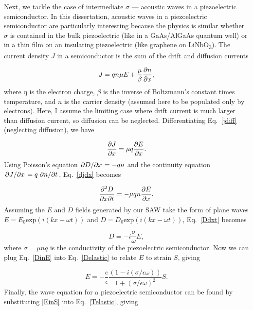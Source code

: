 \documentclass[double,12pt,1in,seploa]{beavtex}
\begin{document}
Next, we tackle the case of intermediate $\sigma$ — acoustic waves in a piezoelectric semiconductor. In this dissertation, acoustic waves in a piezoelectric semiconductor are particularly interesting because the physics is similar whether $\sigma$ is contained in the bulk piezoelectric (like in a GaAs/AlGaAs quantum well) or in a thin film on an insulating piezoelectric (like graphene on LiNbO\textsubscript{3}). The current density $J$ in a semiconductor is the sum of the drift and diffusion currents

\begin{equation}
    J = q n \mu E + \frac{\mu}{\beta} \pdv{n}{x}, \label{jdiff}
\end{equation}
where q is the electron charge, $\beta$ is the inverse of Boltzmann's constant times temperature, and $n$ is the carrier density (assumed here to be populated only by electrons). Here, I assume the limiting case where drift current is much larger than diffusion current, so diffusion can be neglected. Differentiating Eq.\ \ref{jdiff} (neglecting diffusion), we have

\begin{equation}
    \pdv{J}{x} = \mu q \pdv{E}{x}. \label{djdx}
\end{equation}
Using Poisson's equation $\pdv*{D}{x} = -qn$ and the continuity equation $\pdv*{J}{x} = q \pdv*{n}{t}$, Eq.\ \ref{djdx} becomes

\begin{equation}
    \pdv{D}{x}{t} = -\mu q n \pdv{E}{x}. \label{Ddxt}
\end{equation}
Assuming the $E$ and $D$ fields generated by our SAW take the form of plane waves $E = E_0 \mathrm{exp}(i(kx - \omega t))$ and $D = D_0 \mathrm{exp}(i(kx - \omega t))$, Eq.\ \ref{Ddxt} becomes

\begin{equation}
    D = -i\frac{\sigma}{\omega} E, \label{DinE}
\end{equation}
where $\sigma = \mu n q$ is the conductivity of the piezoelectric semiconductor. Now we can plug Eq.\ \ref{DinE} into Eq.\ \ref{Delastic} to relate $E$ to strain $S$, giving

\begin{equation}
    E = -\frac{e}{\epsilon}\frac{(1-i(\sigma/\epsilon\omega))}{1+(\sigma/\epsilon\omega)^2}S. \label{EinS}
\end{equation}
Finally, the wave equation for a piezoelectric semiconductor can be found by substituting \ref{EinS} into Eq.\ \ref{Telastic}, giving
\end{document}
